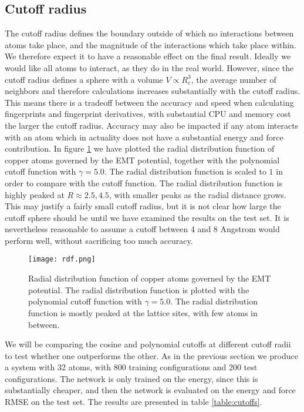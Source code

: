 \subsection{Cutoff radius}
The cutoff radius defines the boundary outside of which no interactions
between atoms take place, and the magnitude of the interactions
which take place within. We therefore expect it to have a reasonable
effect on the final result. Ideally we would like all atoms to interact,
as they do in the real world.
However, since the cutoff radius defines a sphere
with a volume $V \propto R_c^3$, the average number of neighbors and therefore
calculations increases substantially with the cutoff radius.
This means there is a tradeoff
between the accuracy and speed when calculating fingerprints and
fingerprint derivatives, with substantial CPU and memory cost the
larger the cutoff radius.
Accuracy may also be impacted if any
atom interacts with an atom which in actuality does not have a substantial
energy and force contribution.
In figure \ref{fig:copper-cutoff} we have plotted the radial distribution
function of copper atoms governed by the EMT potential, together
with the polynomial cutoff function with $\gamma = 5.0$.
The radial distribution function is scaled to $1$ in order to compare
with the cutoff function.
The radial distribution function is highly peaked at $R \approx 2.5, 4.5$,
with smaller peaks as the radial distance grows.
This may justify a fairly small cutoff radius, but it is not clear
how large the cutoff sphere should be until we have examined the results
on the test set.
It is nevertheless reasonable to assume a cutoff between 4 and 8 Angstrom
would perform well, without sacrificing too much accuracy.

\begin{figure}[H]
    \centering
    \texttt{[image: rdf.png]}
    \caption{Radial distribution function of copper atoms
        governed by the EMT potential. The radial distribution function
        is plotted with the polynomial cutoff function with $\gamma = 5.0$.
        The radial distribution function is mostly peaked at the lattice sites,
        with few atoms in between.}
    \label{fig:copper-cutoff}
\end{figure}

We will be comparing the cosine and polynomial cutoffs at different
cutoff radii to test whether one outperforms the other.
As in the previous section we produce a system with 32 atoms, with
800 training configurations and 200 test configurations. The network
is only trained on the energy, since this is substantially cheaper,
and then the network is evaluated on the energy and force RMSE
on the test set. The results are presented in table \ref{table:cutoffs}.

